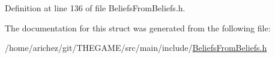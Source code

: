 Definition at line 136 of file Beliefs\-From\-Beliefs.\-h.



The documentation for this struct was generated from the following file\-:\begin{DoxyCompactItemize}
\item 
/home/arichez/git/\-T\-H\-E\-G\-A\-M\-E/src/main/include/\hyperlink{_beliefs_from_beliefs_8h}{Beliefs\-From\-Beliefs.\-h}\end{DoxyCompactItemize}
